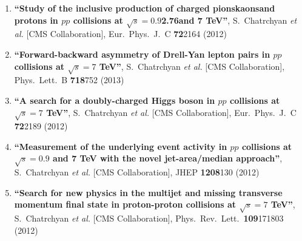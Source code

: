 \begin{enumerate}
\item%
{\bf ``Study of the inclusive production of charged pionskaonsand protons in $pp$ collisions at $\sqrt{s}=0.9$2.76and 7 TeV''}, 
  S.~Chatrchyan {\it et al.}  [CMS Collaboration], 
Eur.\ Phys.\ J.\ C {\bf 72}2164 (2012) %


\item%
{\bf ``Forward-backward asymmetry of Drell-Yan lepton pairs in $pp$ collisions at $\sqrt{s} = 7$ TeV''}, 
  S.~Chatrchyan {\it et al.}  [CMS Collaboration], 
Phys.\ Lett.\ B {\bf 718}752 (2013) %


\item%
{\bf ``A search for a doubly-charged Higgs boson in $pp$ collisions at $\sqrt{s}=7$ TeV''}, 
  S.~Chatrchyan {\it et al.}  [CMS Collaboration], 
Eur.\ Phys.\ J.\ C {\bf 72}2189 (2012) %


\item%
{\bf ``Measurement of the underlying event activity in $pp$ collisions at $\sqrt{s} = 0.9$ and 7 TeV with the novel jet-area/median approach''}, 
  S.~Chatrchyan {\it et al.}  [CMS Collaboration], 
JHEP {\bf 1208}130 (2012) %


\item%
{\bf ``Search for new physics in the multijet and missing transverse momentum final state in proton-proton collisions at $\sqrt{s} = 7$ TeV''}, 
  S.~Chatrchyan {\it et al.}  [CMS Collaboration], 
Phys.\ Rev.\ Lett.\  {\bf 109}171803 (2012) %



\end{enumerate}
